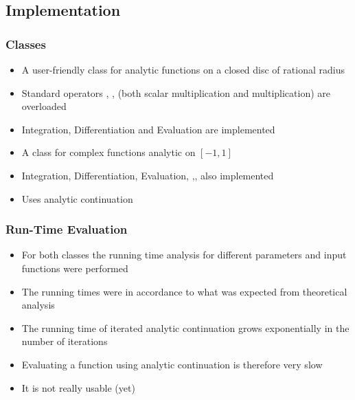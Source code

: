 
\subsection{Implementation}
\begin{frame}[<+->]
\frametitle{Classes}
\begin{itemize}
\item A user-friendly class for analytic functions on a closed disc of rational radius
\item Standard operators \code{+}, \code{-}, \code{*} (both scalar multiplication and multiplication) are overloaded
\item Integration, Differentiation and Evaluation are implemented
\end{itemize}
\pause
{}
\begin{itemize}
\item A class for complex functions analytic on $[-1,1]$
\item Integration, Differentiation, Evaluation, \code{+},\code{-},  \code{*} also implemented  
\item Uses analytic continuation
\end{itemize}
\end{frame}
\begin{frame}[<+->]
\frametitle{Run-Time Evaluation}
\begin{itemize}
	\item For both classes the running time analysis for different parameters and input functions were performed
	\item The running times were in accordance to what was expected from theoretical analysis
	\item The running time of iterated analytic continuation grows exponentially in the number of iterations 
	\item Evaluating a function using analytic continuation is therefore very slow
	\item It is not really usable (yet)
\end{itemize}
\end{frame}


